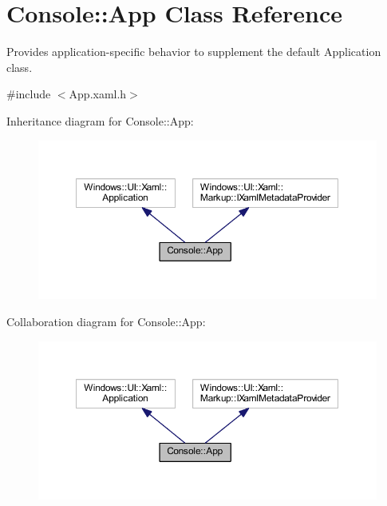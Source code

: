 \hypertarget{class_console_1_1_app}{}\section{Console\+:\+:App Class Reference}
\label{class_console_1_1_app}


Provides application-\/specific behavior to supplement the default Application class.  




{\ttfamily \#include $<$App.\+xaml.\+h$>$}



Inheritance diagram for Console\+:\+:App\+:\nopagebreak
\begin{figure}[H]
\begin{center}
\leavevmode
\includegraphics[width=350pt]{class_console_1_1_app__inherit__graph}
\end{center}
\end{figure}


Collaboration diagram for Console\+:\+:App\+:\nopagebreak
\begin{figure}[H]
\begin{center}
\leavevmode
\includegraphics[width=350pt]{class_console_1_1_app__coll__graph}
\end{center}
\end{figure}

